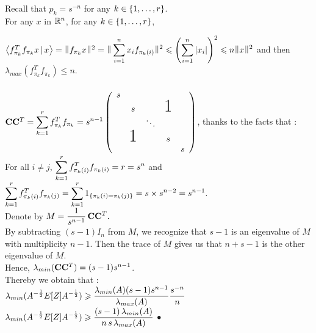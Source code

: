 Recall that $p_{k} = s^{-n}$ for any $k\in \left\{1,\dots,r\right\}$.\\

For any $x$ in ${\mathbb R}^{n}$, for any $k\in \left\{1,\dots,r\right\}$,

$\scal{f_{\pi_{k}}^{T} f_{\pi_{k}} x }{x} = \norm{ f_{\pi_{k}}x }^{2} = \norm{\dsp\sum_{i=1}^{n} x_{i}f_{\pi_{k}(i)} }^{2} \leq \pare{\dsp\sum_{i=1}^{n} \abs{x_{i}}}^{2} \leq n\norm{x}^{2}$
 and then $\lambda_{max}( f_{\pi_{k}}^{T} f_{\pi_{k}}  ) \leq n$.\\\\
 
 
 
$\bold{C} \bold{C}^{T}= \dsp\sum\limits_{k=1}^{r} f_{\pi_{k}}^{T} f_{\pi_{k}} = s^{n-1}
    \left(
    \begin{array}{ccccc}
    s                                    \\
      & s             &   & \text{\huge1}\\
      &               & \ddots               \\
      & \text{\huge1} &   & s            \\
      &               &   &   & s
    \end{array}
    \right)$, thanks to the facts that :\\ For all $i\neq j$, $\displaystyle\sum\limits_{k=1}^{r} f_{\pi_{k}(i)}^{T} f_{\pi_{k}(i)} = r = s^{n}$ and $\displaystyle\sum\limits_{k=1}^{r} f_{\pi_{k}(i)}^{T} f_{\pi_{k}(j)} = \displaystyle\sum\limits_{k=1}^{r} 1_{\left\{\pi_{k}(i) = \pi_{k}(j)\right\}} = s \times s^{n-2} = s^{n-1}.$\\
Denote by $\displaystyle M = \frac{1}{s^{n-1}}\, \bold{C} \bold{C}^{T}.$\\

By subtracting $(s-1)I_{n}$ from $M$, we recognize that $s-1$ is an eigenvalue of $M$ with multiplicity $n-1$. Then the trace of $M$ gives us that $n+s-1$ is the other eigenvalue of $M$.\\ 
Hence, $\lambda_{min}(\bold{C} \bold{C}^{T}) = (s-1)s^{n-1}$.\\

Thereby we obtain that :\\ 


$\displaystyle \lambda_{min}(A^{-\frac12}E[Z]A^{-\frac12} )  \geqslant  \frac{\lambda_{min}(A) (s-1)s^{n-1}}{ \lambda_{max}(A)}  \frac{s^{-n}}{n}$ \\


$\displaystyle \lambda_{min}(A^{-\frac12}E[Z]A^{-\frac12} )  \geqslant  \frac{(s-1)\,\lambda_{min}(A)}{n \, s \,\lambda_{max}(A)} $ $\bullet$


